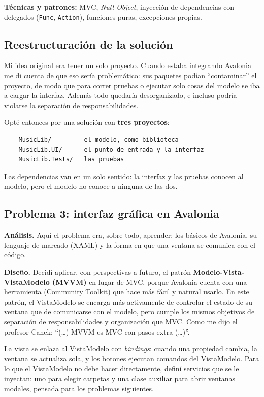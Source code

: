 \documentclass{article}
\begin{document}
\textbf{Técnicas y patrones:} MVC, \emph{Null Object}, inyección de
dependencias con delegados (\texttt{Func}, \texttt{Action}), funciones puras,
excepciones propias.

\subsection{Reestructuración de la solución}

Mi idea original era tener un solo proyecto. Cuando estaba integrando
Avalonia me di cuenta de que eso sería problemático: sus paquetes podían
``contaminar'' el proyecto, de modo que para correr pruebas o ejecutar solo
cosas del modelo se iba a cargar la interfaz. Además todo quedaría
desorganizado, e incluso podría violarse la separación de responsabilidades.

Opté entonces por una solución con \textbf{tres proyectos}:

\begin{verbatim}
    MusicLib/         el modelo, como biblioteca
    MusicLib.UI/      el punto de entrada y la interfaz
    MusicLib.Tests/   las pruebas
\end{verbatim}

Las dependencias van en un solo sentido: la interfaz y las pruebas conocen al
modelo, pero el modelo no conoce a ninguna de las dos.

\subsection{Problema 3: interfaz gráfica en Avalonia}

\textbf{Análisis.} Aquí el problema era, sobre todo, aprender: los básicos
de Avalonia, su lenguaje de marcado (XAML) y la forma en que una ventana se
comunica con el código.

\textbf{Diseño.} Decidí aplicar, con perspectivas a futuro, el patrón
\textbf{Modelo-Vista-VistaModelo (MVVM)} en lugar de MVC, porque Avalonia
cuenta con una herramienta (Community Toolkit) que hace más fácil y natural
usarlo. En este patrón, el VistaModelo se encarga más activamente de
controlar el estado de su ventana que de comunicarse con el modelo, pero
cumple los mismos objetivos de separación de responsabilidades y organización
que MVC. Como me dijo el profesor Canek: ``(\ldots) MVVM es MVC con pasos
extra (\ldots)''.

La vista se enlaza al VistaModelo con \emph{bindings}: cuando una propiedad
cambia, la ventana se actualiza sola, y los botones ejecutan comandos del
VistaModelo. Para lo que el VistaModelo no debe hacer directamente, definí
servicios que se le inyectan: uno para elegir carpetas y una clase auxiliar
para abrir ventanas modales, pensada para los problemas siguientes.
\end{document}
